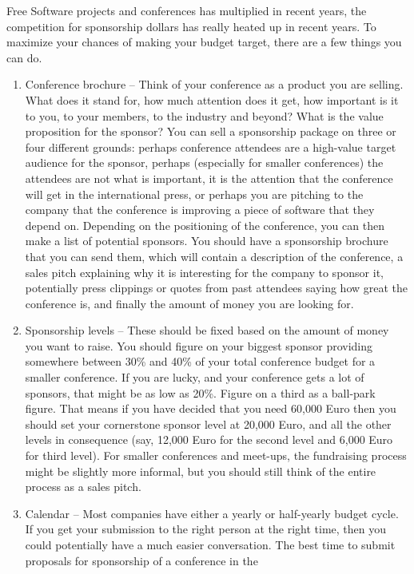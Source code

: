 \begin{itemize}
Free Software projects and conferences has multiplied in recent years,
the competition for sponsorship dollars has really heated up in recent
years. To maximize your chances of making your budget target, there are
a few things you can do.
 \begin{enumerate}
  \item Conference brochure -- Think of your conference as a product you are
selling. What does it stand for, how much attention does it get, how
important is it to you, to your members, to the industry and beyond?
What is the value proposition for the sponsor?
You can sell a sponsorship package on three or four different grounds:
perhaps conference attendees are a high-value target audience for the
sponsor, perhaps (especially for smaller conferences) the attendees
are not what is important, it is the attention that the conference will get
in the international press, or perhaps you are pitching to the company
that the conference is improving a piece of software that they depend on.
Depending on the positioning of the conference, you can then make a
list of potential sponsors. You should have a sponsorship brochure that
you can send them, which will contain a description of the conference, a
sales pitch explaining why it is interesting for the company to sponsor
it, potentially press clippings or quotes from past attendees saying how
great the conference is, and finally the amount of money you are looking for.
  \item Sponsorship levels -- These should be fixed based on the amount of
money you want to raise. You should figure on your biggest sponsor
providing somewhere between 30\% and 40\% of your total conference budget
for a smaller conference. If you are lucky, and your conference gets a
lot of sponsors, that might be as low as 20\%. Figure on a third as a
ball-park figure. That means if you have decided that you need 60,000 Euro
then you should set your cornerstone sponsor level at 20,000 Euro, and all
the other levels in consequence (say, 12,000 Euro for the second level and
6,000 Euro for third level).
For smaller conferences and meet-ups, the fundraising process might be
slightly more informal, but you should still think of the entire process
as a sales pitch.
  \item Calendar -- Most companies have either a yearly or half-yearly
budget cycle. If you get your submission to the right person at the
right time, then you could potentially have a much easier conversation.
The best time to submit proposals for sponsorship of a conference in the

\end{enumerate}
\end{itemize}
